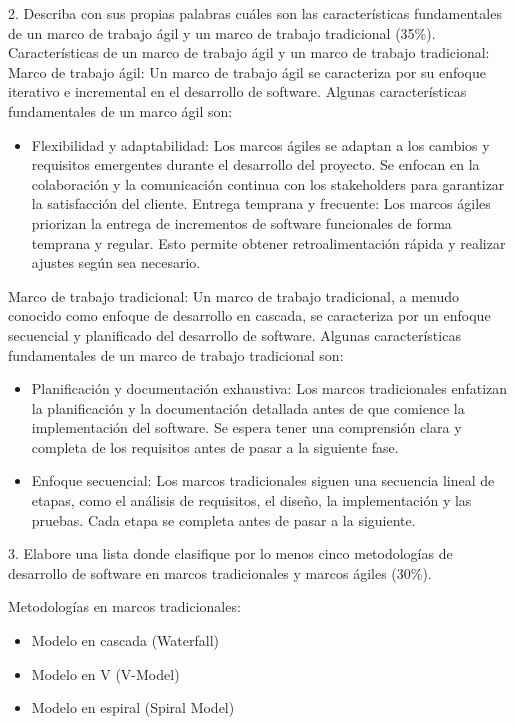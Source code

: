 \documentclass{article}
\theoremstyle{mytheoremstyle}
\theoremstyle{mytheoremstyle}
\theoremstyle{myproblemstyle}
\begin{document}
 2. Describa con sus propias palabras cuáles son las características fundamentales de un marco de trabajo ágil y un marco de trabajo tradicional (35\%).
\newline Características de un marco de trabajo ágil y un marco de trabajo tradicional:
\newline Marco de trabajo ágil: Un marco de trabajo ágil se caracteriza por su enfoque iterativo e incremental en el desarrollo de software. Algunas características fundamentales de un marco ágil son:
\begin{itemize}
    \item Flexibilidad y adaptabilidad: Los marcos ágiles se adaptan a los cambios y requisitos emergentes durante el desarrollo del proyecto. Se enfocan en la colaboración y la comunicación continua con los stakeholders para garantizar la satisfacción del cliente.
    Entrega temprana y frecuente: Los marcos ágiles priorizan la entrega de incrementos de software funcionales de forma temprana y regular. Esto permite obtener retroalimentación rápida y realizar ajustes según sea necesario. 
    \end{itemize}

Marco de trabajo tradicional: Un marco de trabajo tradicional, a menudo conocido como enfoque de desarrollo en cascada, se caracteriza por un enfoque secuencial y planificado del desarrollo de software. Algunas características fundamentales de un marco de trabajo tradicional son:
\begin{itemize}
    \item Planificación y documentación exhaustiva: Los marcos tradicionales enfatizan la planificación y la documentación detallada antes de que comience la implementación del software. Se espera tener una comprensión clara y completa de los requisitos antes de pasar a la siguiente fase.
    \item Enfoque secuencial: Los marcos tradicionales siguen una secuencia lineal de etapas, como el análisis de requisitos, el diseño, la implementación y las pruebas. Cada etapa se completa antes de pasar a la siguiente.
\end{itemize}
3. Elabore una lista donde clasifique por lo menos cinco metodologías de desarrollo de software en marcos tradicionales y marcos ágiles (30\%).

Metodologías en marcos tradicionales:
\begin{itemize}
    \item Modelo en cascada (Waterfall)
    \item Modelo en V (V-Model)
    \item Modelo en espiral (Spiral Model)
\end{itemize}
\end{document}
